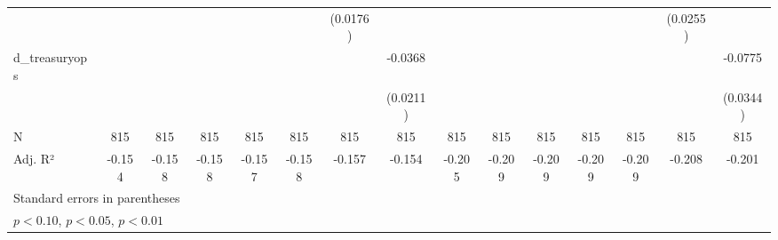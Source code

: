 {\begin{tabular}{l*{14}{c}}
                    &                     &                     &                     &                     &                     &    (0.0176)         &                     &                     &                     &                     &                     &                     &    (0.0255)         &                     \\
d\_treasuryops       &                     &                     &                     &                     &                     &                     &     -0.0368\sym{*}  &                     &                     &                     &                     &                     &                     &     -0.0775\sym{**} \\
                    &                     &                     &                     &                     &                     &                     &    (0.0211)         &                     &                     &                     &                     &                     &                     &    (0.0344)         \\
\hline
N                   &         815         &         815         &         815         &         815         &         815         &         815         &         815         &         815         &         815         &         815         &         815         &         815         &         815         &         815         \\
Adj. R²             &      -0.154         &      -0.158         &      -0.158         &      -0.157         &      -0.158         &      -0.157         &      -0.154         &      -0.205         &      -0.209         &      -0.209         &      -0.209         &      -0.209         &      -0.208         &      -0.201         \\
\hline\hline
\multicolumn{15}{l}{\footnotesize Standard errors in parentheses}\\
\multicolumn{15}{l}{\footnotesize \sym{*} \(p<0.10\), \sym{**} \(p<0.05\), \sym{***} \(p<0.01\)}\\
\end{tabular}
}
